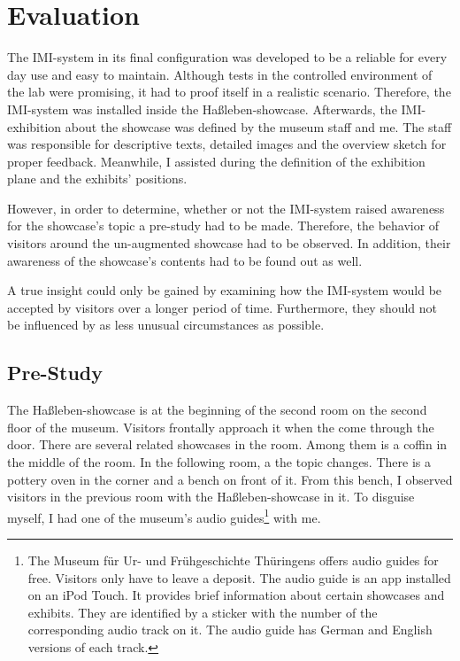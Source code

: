 \chapter{Evaluation}
\label{evaluation}

The \ac{IMI}-system in its final configuration was developed to be a reliable for every day use and easy to maintain. Although tests in the controlled environment of the lab were promising, it had to proof itself in a realistic scenario. Therefore, the \ac{IMI}-system was installed inside the Haßleben-showcase. Afterwards, the \ac{IMI}-exhibition about the showcase was defined by the museum staff and me. The staff was responsible for descriptive texts, detailed images and the overview sketch for proper feedback. Meanwhile, I assisted during the definition of the exhibition plane and the exhibits' positions.

However, in order to determine, whether or not the \ac{IMI}-system raised awareness for the showcase's topic a pre-study had to be made. Therefore, the behavior of visitors around the un-augmented showcase had to be observed. In addition, their awareness of the showcase's contents had to be found out as well.

A true insight could only be gained by examining how the \ac{IMI}-system would be accepted by visitors over a longer period of time. Furthermore, they should not be influenced by as less unusual circumstances as possible.


\section{Pre-Study}
\label{evaluation_pre}

The Haßleben-showcase is at the beginning of the second room on the second floor of the museum. Visitors frontally approach it when the come through the door. There are several related showcases in the room. Among them is a coffin in the middle of the room. In the following room, a the topic changes. There is a pottery oven in the corner and a bench on front of it. From this bench, I observed visitors in the previous room with the Haßleben-showcase in it. To disguise myself, I had one of the museum's audio guides\footnote{The Museum für Ur- und Frühgeschichte Thüringens offers audio guides for free. Visitors only have to leave a deposit. The audio guide is an app installed on an iPod Touch. It provides brief information about certain showcases and exhibits. They are identified by a sticker with the number of the corresponding audio track on it. The audio guide has German and English versions of each track.} with me.  

